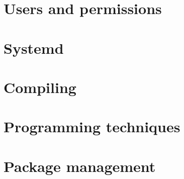 \documentclass[oneside]{book}
\begin{document}
\part{Users and permissions}
\part{Systemd}

\part{Compiling}





\part{Programming techniques}



\part{Package management}




%
\end{document}
